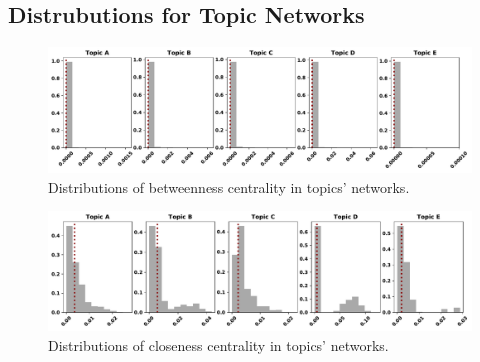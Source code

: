 \documentclass{article}
\theoremstyle{definition}
\begin{document}
\subsection{Distrubutions for Topic Networks}\label{appendix:distributions}

\begin{figure}[!hbtp]
    \centering
    \includegraphics[width=\textwidth]{./assets/images/topics_betweeness_distributions.pdf}
    \caption{Distributions of betweenness centrality in topics' networks.}
    \label{fig:bc_distributions_topics}
\end{figure}

\begin{figure}[!hbtp]
    \centering
    \includegraphics[width=\textwidth]{./assets/images/topics_closeness_distributions.pdf}
    \caption{Distributions of closeness centrality in topics' networks.}
    \label{fig:cc_distributions_topics}
\end{figure}
\end{document}

